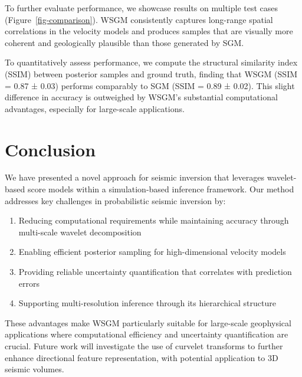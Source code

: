 \documentclass[
]{article}
\providecommand{\tightlist}{%
  \setlength{\itemsep}{0pt}\setlength{\parskip}{0pt}}\usepackage{longtable,booktabs,array}
\begin{document}
To further evaluate performance, we showcase results on multiple test
cases (Figure~\ref{fig-comparison}). WSGM consistently captures
long-range spatial correlations in the velocity models and produces
samples that are visually more coherent and geologically plausible than
those generated by SGM.

To quantitatively assess performance, we compute the structural
similarity index (SSIM) between posterior samples and ground truth,
finding that WSGM (SSIM = 0.87 ± 0.03) performs comparably to SGM (SSIM
= 0.89 ± 0.02). This slight difference in accuracy is outweighed by
WSGM's substantial computational advantages, especially for large-scale
applications.

\section{Conclusion}\label{conclusion}

We have presented a novel approach for seismic inversion that leverages
wavelet-based score models within a simulation-based inference
framework. Our method addresses key challenges in probabilistic seismic
inversion by:

\begin{enumerate}
\def\labelenumi{\arabic{enumi}.}
\tightlist
\item
  Reducing computational requirements while maintaining accuracy through
  multi-scale wavelet decomposition
\item
  Enabling efficient posterior sampling for high-dimensional velocity
  models
\item
  Providing reliable uncertainty quantification that correlates with
  prediction errors
\item
  Supporting multi-resolution inference through its hierarchical
  structure
\end{enumerate}

These advantages make WSGM particularly suitable for large-scale
geophysical applications where computational efficiency and uncertainty
quantification are crucial. Future work will investigate the use of
curvelet transforms to further enhance directional feature
representation, with potential application to 3D seismic volumes.
\end{document}
